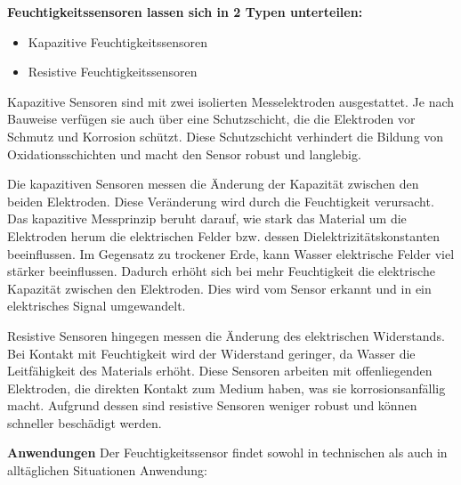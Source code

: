 		\vspace{1\baselineskip}

		\textbf{Feuchtigkeitssensoren lassen sich in 2 Typen unterteilen:  } 
		\begin{itemize}
			\item Kapazitive Feuchtigkeitssensoren
			
			\item Resistive Feuchtigkeitssensoren	
		\end{itemize}
		
		Kapazitive Sensoren sind mit zwei isolierten Messelektroden ausgestattet. Je nach Bauweise verfügen sie auch über eine Schutzschicht, die die Elektroden vor Schmutz und Korrosion schützt. Diese Schutzschicht verhindert die Bildung von Oxidationsschichten und macht den Sensor robust und langlebig. 
		
		\vspace{1\baselineskip}
		
		Die kapazitiven Sensoren messen die Änderung der Kapazität zwischen den beiden Elektroden. Diese Veränderung wird durch die Feuchtigkeit verursacht. Das kapazitive Messprinzip beruht darauf, wie stark das Material um die Elektroden herum die elektrischen Felder bzw. dessen Dielektrizitätskonstanten beeinflussen. Im Gegensatz zu trockener Erde, kann Wasser elektrische Felder viel stärker beeinflussen. Dadurch erhöht sich bei mehr Feuchtigkeit die elektrische Kapazität zwischen den Elektroden. Dies wird vom Sensor erkannt und in ein elektrisches Signal umgewandelt. 
		
		\vspace{1\baselineskip}
		
		Resistive Sensoren hingegen messen die Änderung des elektrischen Widerstands. Bei Kontakt mit Feuchtigkeit wird der Widerstand geringer, da Wasser die Leitfähigkeit des Materials erhöht. Diese Sensoren arbeiten mit offenliegenden Elektroden, die direkten Kontakt zum Medium haben, was sie korrosionsanfällig macht. Aufgrund dessen sind resistive Sensoren weniger robust und können schneller beschädigt werden. \cite{Hesse:2014} \cite{Farahani:2014}
		
		\vspace{1\baselineskip}
		
		\textbf{Anwendungen}
		Der Feuchtigkeitssensor findet sowohl in technischen als auch in alltäglichen Situationen Anwendung:
		\cite{Marcinkowska:2023}
		

